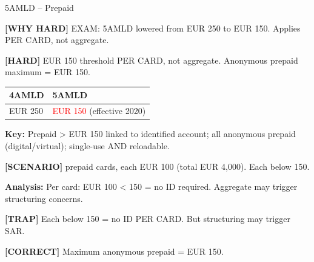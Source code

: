\documentclass[6pt,aspectratio=169,fontsize=5pt]{beamer}
\renewcommand{\tiny}{\fontsize{3.5pt}{4.5pt}\selectfont}
\renewcommand{\normalsize}{\fontsize{7.5pt}{8.5pt}\selectfont}
\newcommand{\trap}[1]{%
	\begin{block}{\textcolor{redtrap}{\textbf{[TRAP]}}}
		\textcolor{redtrap}{\tiny #1}
	\end{block}
}
\newcommand{\scenario}[1]{%
	\begin{block}{\textbf{[SCENARIO]}}
		\tiny #1
	\end{block}
}
\newcommand{\correct}[1]{%
	\begin{block}{\textcolor{greencorrect}{\textbf{[CORRECT]}}}
		\textcolor{greencorrect}{\tiny #1}
	\end{block}
}
\newcommand{\hard}[1]{%
	\begin{block}{\textcolor{hardcolor}{\textbf{[HARD]}}}
		\textcolor{hardcolor}{\tiny #1}
	\end{block}
}
\newcommand{\hardexplain}[1]{%
	\begin{block}{\textcolor{orangehard}{\textbf{[WHY HARD]}}}
		\textcolor{orangehard}{\tiny #1}
	\end{block}
}
\begin{document}
	\begin{frame}{\normalsize 5AMLD -- Prepaid}
		
		\hardexplain{EXAM: 5AMLD lowered from EUR 250 to EUR 150. Applies PER CARD, not aggregate.}
		
		\hard{EUR 150 threshold PER CARD, not aggregate. Anonymous prepaid maximum = EUR 150.}
		
		\begin{table}
			\begin{tabular}{|p{4cm}|p{4cm}|}
				\hline
				\textbf{4AMLD} & \textbf{5AMLD} \\
				\hline
				EUR 250 & \textcolor{red}{EUR 150} (effective 2020) \\
				\hline
			\end{tabular}
		\end{table}
		
		\textbf{Key:} Prepaid > EUR 150 linked to identified account; all anonymous prepaid (digital/virtual); single-use AND reloadable.
		
		\scenario{40 prepaid cards, each EUR 100 (total EUR 4,000). Each below 150.}
		
		\textbf{Analysis:} Per card: EUR 100 < 150 = no ID required. Aggregate may trigger structuring concerns.
		
		\trap{Each below 150 = no ID PER CARD. But structuring may trigger SAR.}
		
		\correct{Maximum anonymous prepaid = EUR 150.}
	\end{frame}
	
\end{document}
